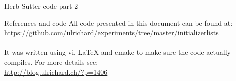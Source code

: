 \documentclass[11pt]{beamer}
\begin{document}
\begin{frame}{Herb Sutter code part 2}

\end{frame}

\begin{frame}{References and code}
All code presented in this document can be found at:\\
\href{https://github.com/ulrichard/experiments/tree/master/initializerlists}{https://github.com/ulrichard/experiments/tree/master/initializerlists}\\
\\[0.5cm]
It was written using vi, LaTeX and cmake to make sure the code actually compiles. For more details see:\\
\href{http://blog.ulrichard.ch/?p=1406}{http://blog.ulrichard.ch/?p=1406}
\end{frame}
\end{document}
